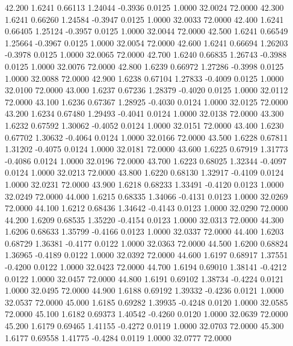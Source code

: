   42.200   1.6241   0.66113   1.24044  -0.3936   0.0125   1.0000  32.0024  72.0000
  42.300   1.6241   0.66260   1.24584  -0.3947   0.0125   1.0000  32.0033  72.0000
  42.400   1.6241   0.66405   1.25124  -0.3957   0.0125   1.0000  32.0044  72.0000
  42.500   1.6241   0.66549   1.25664  -0.3967   0.0125   1.0000  32.0054  72.0000
  42.600   1.6241   0.66694   1.26203  -0.3978   0.0125   1.0000  32.0065  72.0000
  42.700   1.6240   0.66835   1.26743  -0.3988   0.0125   1.0000  32.0076  72.0000
  42.800   1.6239   0.66972   1.27286  -0.3998   0.0125   1.0000  32.0088  72.0000
  42.900   1.6238   0.67104   1.27833  -0.4009   0.0125   1.0000  32.0100  72.0000
  43.000   1.6237   0.67236   1.28379  -0.4020   0.0125   1.0000  32.0112  72.0000
  43.100   1.6236   0.67367   1.28925  -0.4030   0.0124   1.0000  32.0125  72.0000
  43.200   1.6234   0.67480   1.29493  -0.4041   0.0124   1.0000  32.0138  72.0000
  43.300   1.6232   0.67592   1.30062  -0.4052   0.0124   1.0000  32.0151  72.0000
  43.400   1.6230   0.67702   1.30632  -0.4064   0.0124   1.0000  32.0166  72.0000
  43.500   1.6228   0.67811   1.31202  -0.4075   0.0124   1.0000  32.0181  72.0000
  43.600   1.6225   0.67919   1.31773  -0.4086   0.0124   1.0000  32.0196  72.0000
  43.700   1.6223   0.68025   1.32344  -0.4097   0.0124   1.0000  32.0213  72.0000
  43.800   1.6220   0.68130   1.32917  -0.4109   0.0124   1.0000  32.0231  72.0000
  43.900   1.6218   0.68233   1.33491  -0.4120   0.0123   1.0000  32.0249  72.0000
  44.000   1.6215   0.68335   1.34066  -0.4131   0.0123   1.0000  32.0269  72.0000
  44.100   1.6212   0.68436   1.34642  -0.4143   0.0123   1.0000  32.0290  72.0000
  44.200   1.6209   0.68535   1.35220  -0.4154   0.0123   1.0000  32.0313  72.0000
  44.300   1.6206   0.68633   1.35799  -0.4166   0.0123   1.0000  32.0337  72.0000
  44.400   1.6203   0.68729   1.36381  -0.4177   0.0122   1.0000  32.0363  72.0000
  44.500   1.6200   0.68824   1.36965  -0.4189   0.0122   1.0000  32.0392  72.0000
  44.600   1.6197   0.68917   1.37551  -0.4200   0.0122   1.0000  32.0423  72.0000
  44.700   1.6194   0.69010   1.38141  -0.4212   0.0122   1.0000  32.0457  72.0000
  44.800   1.6191   0.69102   1.38734  -0.4224   0.0121   1.0000  32.0495  72.0000
  44.900   1.6188   0.69192   1.39332  -0.4236   0.0121   1.0000  32.0537  72.0000
  45.000   1.6185   0.69282   1.39935  -0.4248   0.0120   1.0000  32.0585  72.0000
  45.100   1.6182   0.69373   1.40542  -0.4260   0.0120   1.0000  32.0639  72.0000
  45.200   1.6179   0.69465   1.41155  -0.4272   0.0119   1.0000  32.0703  72.0000
  45.300   1.6177   0.69558   1.41775  -0.4284   0.0119   1.0000  32.0777  72.0000
